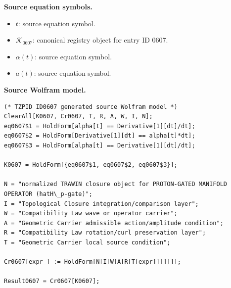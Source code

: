 \begin{minipage}[t]{0.49\linewidth}
\begingroup
\small
\raggedright
\textbf{Source equation symbols.}\par
\begin{itemize}[leftmargin=1.35em,itemsep=1pt,topsep=1pt,parsep=0pt]
    \item $t$: source equation symbol.
    \item $\mathcal{K}_{0607}$: canonical registry object for entry ID 0607.
    \item $\alpha(t)$: source equation symbol.
    \item $a(t)$: source equation symbol.
\end{itemize}
\endgroup
\end{minipage}\hfill
\begin{minipage}[t]{0.47\linewidth}
\begingroup
\scriptsize
\raggedright
\textbf{Source Wolfram model.}\par
\begin{Verbatim}[fontsize=\tiny,breaklines=true,breakanywhere=true]
(* TZPID ID0607 generated source Wolfram model *)
ClearAll[K0607, Cr0607, T, R, A, W, I, N];
eq0607$1 = HoldForm[alpha[t] == Derivative[1][dt]/dt];
eq0607$2 = HoldForm[Derivative[1][dt] == alpha[t]*dt];
eq0607$3 = HoldForm[alpha[t] == Derivative[1][dt]/dt];

K0607 = HoldForm[{eq0607$1, eq0607$2, eq0607$3}];

N = "normalized TRAWIN closure object for PROTON-GATED MANIFOLD OPERATOR (hatH\_p-gate)";
I = "Topological Closure integration/comparison layer";
W = "Compatibility Law wave or operator carrier";
A = "Geometric Carrier admissible action/amplitude condition";
R = "Compatibility Law rotation/curl preservation layer";
T = "Geometric Carrier local source condition";

Cr0607[expr_] := HoldForm[N[I[W[A[R[T[expr]]]]]]];

Result0607 = Cr0607[K0607];
\end{Verbatim}
\endgroup
\end{minipage}

